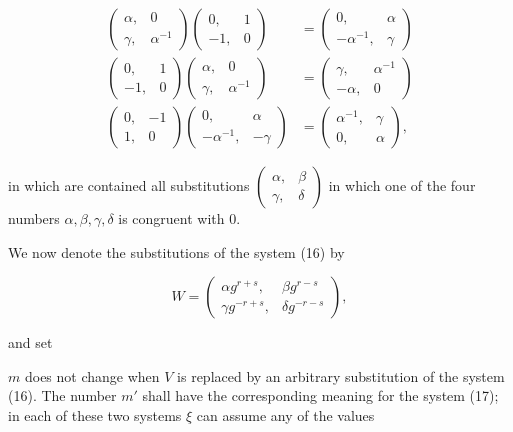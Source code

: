 \begin{align*}
\begin{pmatrix}\alpha, & 0\\ \gamma, & \alpha^{-1}\end{pmatrix}\begin{pmatrix}0, & 1\\ -1, & 0\end{pmatrix} &=\begin{pmatrix}0, & \alpha\\ -\alpha^{-1}, & \gamma\end{pmatrix}\\
\begin{pmatrix}0, & 1\\ -1, & 0\end{pmatrix}\begin{pmatrix}\alpha, & 0\\ \gamma, & \alpha^{-1}\end{pmatrix} &=\begin{pmatrix}\gamma, & \alpha^{-1}\\ -\alpha, & 0\end{pmatrix}\\
\begin{pmatrix}0, & -1\\ 1, & 0\end{pmatrix}\begin{pmatrix}0, & \alpha\\ -\alpha^{-1}, & -\gamma\end{pmatrix} &=\begin{pmatrix}\alpha^{-1}, & \gamma\\ 0, & \alpha\end{pmatrix},
\end{align*}

in which are contained all substitutions $\begin{pmatrix}\alpha, & \beta\\ \gamma, & \delta\end{pmatrix}$ in which one of the four numbers $\alpha,\beta,\gamma,\delta$ is congruent with $0$.

We now denote the substitutions of the system (16) by

\[ W=\begin{pmatrix}\alpha g^{r+s}, & \beta g^{r-s}\\ \gamma g^{-r+s}, & \delta g^{-r-s}\end{pmatrix}, \]

and set



$m$ does not change when $V$ is replaced by an arbitrary substitution of the system (16). The number $m'$ shall have the corresponding meaning for the system (17); in each of these two systems $\xi$ can assume any of the values

